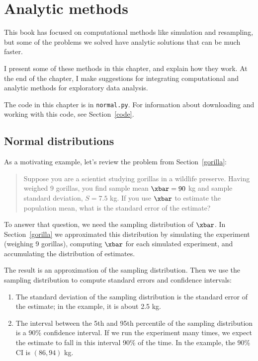 
\chapter{Analytic methods}
\label{analysis}

This book has focused on computational methods like simulation and
resampling, but some of the problems we solved have
analytic solutions that can be much faster.

I present some of these methods in this chapter, and explain
how they work.  At the end of the chapter, I make suggestions
for integrating computational and analytic methods for exploratory
data analysis.

The code in this chapter is in {\tt normal.py}.  For information
about downloading and working with this code, see Section~\ref{code}.


\section{Normal distributions}
\label{why_normal}

As a motivating example, let's review the problem from
Section~\ref{gorilla}:

\begin{quotation}
\noindent Suppose you are a scientist studying gorillas in a wildlife
preserve.  Having weighed 9 gorillas, you find sample mean $\xbar=90$ kg and
sample standard deviation, $S=7.5$ kg.  If you use $\xbar$ to estimate
the population mean, what is the standard error of the estimate?
\end{quotation}

To answer that question, we need the sampling
distribution of $\xbar$.  In Section~\ref{gorilla} we approximated
this distribution by simulating the experiment (weighing
9 gorillas), computing $\xbar$ for each simulated experiment, and
accumulating the distribution of estimates.

The result is an approximation of the sampling distribution.  Then we
use the sampling distribution to compute standard errors and
confidence intervals:

\begin{enumerate}

\item The standard deviation of the sampling distribution is the
  standard error of the estimate; in the example, it is about
  2.5 kg.

\item The interval between the 5th and 95th percentile of the sampling
  distribution is a 90\% confidence interval.  If we run the
  experiment many times, we expect the estimate to fall in this
  interval 90\% of the time.  In the example, the 90\% CI is
  $(86, 94)$ kg.

\end{enumerate}


